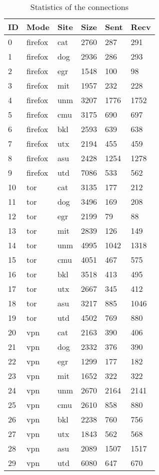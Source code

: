 \documentclass[11pt]{article}
\begin{document}
\begin{table}[]
\centering
\caption{\label{tbl:webstat}
Statistics of the connections}
\begin{tabular}{|l|l|l|l|l|l|}
\hline
ID & Mode    & Site & Size & Sent & Recv \\ \hline
0  & firefox & cat  & 2760 & 287  & 291  \\ \hline
1  & firefox & dog  & 2936 & 286  & 293  \\ \hline
2  & firefox & egr  & 1548 & 100  & 98   \\ \hline
3  & firefox & mit  & 1957 & 232  & 228  \\ \hline
4  & firefox & unm  & 3207 & 1776 & 1752 \\ \hline
5  & firefox & cmu  & 3175 & 690  & 697  \\ \hline
6  & firefox & bkl  & 2593 & 639  & 638  \\ \hline
7  & firefox & utx  & 2194 & 455  & 459  \\ \hline
8  & firefox & asu  & 2428 & 1254 & 1278 \\ \hline
9  & firefox & utd  & 7086 & 533  & 562  \\ \hline
10 & tor     & cat  & 3135 & 177  & 212  \\ \hline
11 & tor     & dog  & 3496 & 169  & 208  \\ \hline
12 & tor     & egr  & 2199 & 79   & 88   \\ \hline
13 & tor     & mit  & 2839 & 126  & 149  \\ \hline
14 & tor     & unm  & 4995 & 1042 & 1318 \\ \hline
15 & tor     & cmu  & 4051 & 467  & 575  \\ \hline
16 & tor     & bkl  & 3518 & 413  & 495  \\ \hline
17 & tor     & utx  & 2667 & 345  & 412  \\ \hline
18 & tor     & asu  & 3217 & 885  & 1046 \\ \hline
19 & tor     & utd  & 4502 & 769  & 880  \\ \hline
20 & vpn     & cat  & 2163 & 390  & 406  \\ \hline
21 & vpn     & dog  & 2332 & 376  & 390  \\ \hline
22 & vpn     & egr  & 1299 & 177  & 182  \\ \hline
23 & vpn     & mit  & 1652 & 322  & 322  \\ \hline
24 & vpn     & unm  & 2670 & 2164 & 2141 \\ \hline
25 & vpn     & cmu  & 2610 & 858  & 880  \\ \hline
26 & vpn     & bkl  & 2238 & 760  & 756  \\ \hline
27 & vpn     & utx  & 1843 & 562  & 568  \\ \hline
28 & vpn     & asu  & 2089 & 1507 & 1517 \\ \hline
29 & vpn     & utd  & 6080 & 647  & 670  \\ \hline
\end{tabular}
\end{table}
\end{document}
